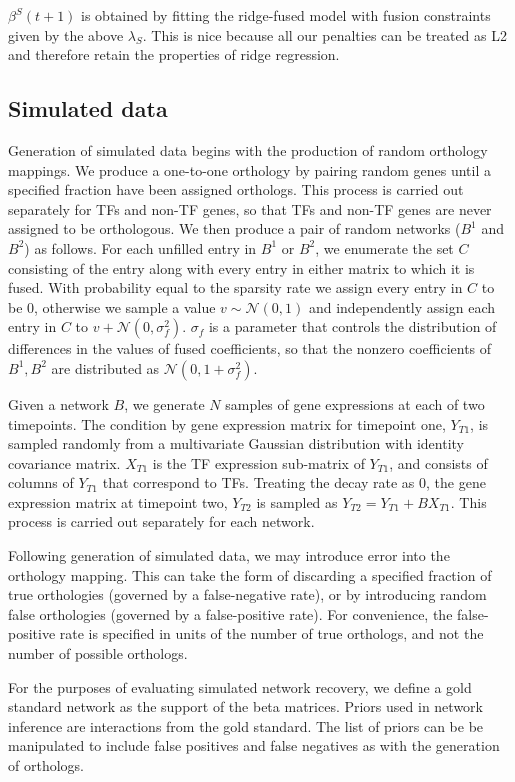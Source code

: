 \documentclass[11pt]{article}
\begin{document}
$\beta^S(t+1)$ is obtained by fitting the ridge-fused model with fusion constraints given by the above $\lambda_S$. This is nice because all our penalties can be treated as L2 and therefore retain the properties of ridge regression. 


\subsection{Simulated data}
Generation of simulated data begins with the production of random orthology mappings. We produce a one-to-one orthology by pairing random genes until a specified fraction have been assigned orthologs. This process is carried out separately for TFs and non-TF genes, so that TFs and non-TF genes are never assigned to be orthologous. We then produce a pair of random networks ($B^1$ and $B^2$) as follows. For each unfilled entry in $B^1$ or $B^2$, we enumerate the set $C$ consisting of the entry along with every entry in either matrix to which it is fused. With probability equal to the sparsity rate we assign every entry in $C$ to be 0, otherwise we sample a value $v \sim \mathcal{N}(0,1)$ and independently assign each entry in $C$ to $v + \mathcal{N}(0, \sigma_f^2)$. $\sigma_f$ is a parameter that controls the distribution of differences in the values of fused coefficients, so that the nonzero coefficients of $B^1, B^2$ are distributed as $\mathcal{N}(0, 1 + \sigma_f^2)$.

Given a network $B$, we generate $N$ samples of gene expressions at each of two timepoints. The condition by gene expression matrix for timepoint one, $Y_{T1}$, is sampled randomly from a multivariate Gaussian distribution with identity covariance matrix. $X_{T1}$ is the TF expression sub-matrix of $Y_{T1}$, and consists of columns of $Y_{T1}$ that correspond to TFs. Treating the decay rate as 0, the gene expression matrix at timepoint two, $Y_{T2}$ is sampled as $Y_{T2} = Y_{T1} + BX_{T1}$. This process is carried out separately for each network. 

Following generation of simulated data, we may introduce error into the orthology mapping. This can take the form of discarding a specified fraction of true orthologies (governed by a false-negative rate), or by introducing random false orthologies (governed by a false-positive rate). For convenience, the false-positive rate is specified in units of the number of true orthologs, and not the number of possible orthologs. 

For the purposes of evaluating simulated network recovery, we define a gold standard network as the support of the beta matrices. Priors used in network inference are interactions from the gold standard. The list of priors can be be manipulated to include false positives and false negatives as with the generation of orthologs. 
\end{document}
